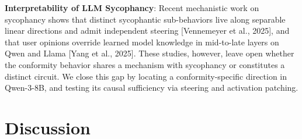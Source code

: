 \documentclass[10pt]{article}
\begin{document}
\textbf{Interpretability of LLM Sycophancy}: Recent mechanistic work on sycophancy shows that distinct sycophantic sub-behaviors live along separable linear directions and admit independent steering [Vennemeyer et al., 2025], and that user opinions override learned model knowledge in mid-to-late layers on Qwen and Llama [Yang et al., 2025]. These studies, however, leave open whether the conformity behavior shares a mechanism with sycophancy or constitutes a distinct circuit. We close this gap by locating a conformity-specific direction in Qwen-3-8B, and testing its causal sufficiency via steering and activation patching.




\section{Discussion}
\end{document}
